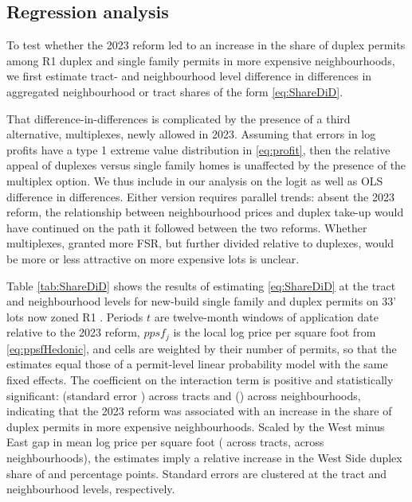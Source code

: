 \documentclass[12pt]{article}
\begin{document}
\subsection{Regression analysis}

To test whether the 2023 reform led to an increase in the share of duplex permits among R1 duplex and single family permits in more expensive neighbourhoods, we first estimate tract- and neighbourhood level difference in differences in aggregated neighbourhood or tract shares of the form \eqref{eq:ShareDiD}.
 
That difference-in-differences is complicated by the presence of a third alternative, multiplexes, newly allowed in 2023. Assuming that errors in log profits have a type 1 extreme value distribution in \eqref{eq:profit}, then the relative appeal of duplexes versus single family homes is unaffected by the presence of the multiplex option. We thus include in our analysis on the logit as well as OLS difference in differences. Either version requires parallel trends: absent the 2023 reform, the relationship between neighbourhood prices and duplex take-up would have continued on the path it followed between the two reforms. Whether multiplexes, granted more FSR, but further divided relative to duplexes, would be more or less attractive on more expensive lots is unclear.


Table \ref{tab:ShareDiD} shows the results of estimating \eqref{eq:ShareDiD} at the tract and neighbourhood levels for new-build single family and duplex permits on 33' lots now zoned R1 \parencite{COVdata,BCAssessment2019}. Periods $t$ are twelve-month windows of application date relative to the 2023 reform, $ppsf_{j}$ is the local log price per square foot from \eqref{eq:ppsfHedonic}, and cells are weighted by their number of permits, so that the estimates equal those of a permit-level linear probability model with the same fixed effects. The coefficient on the interaction term is positive and statistically significant: \sdTractB{} (standard error \sdTractSE) across \sdNTract{} tracts and \sdNbhdB{} (\sdNbhdSE) across \sdNNbhd{} neighbourhoods, indicating that the 2023 reform was associated with an increase in the share of duplex permits in more expensive neighbourhoods. Scaled by the West minus East gap in mean log price per square foot (\sdGapTract{} across tracts, \sdGapNbhd{} across neighbourhoods), the estimates imply a relative increase in the West Side duplex share of \sdEffectGapTract{} and \sdEffectGapNbhd{} percentage points. Standard errors are clustered at the tract and neighbourhood levels, respectively. 
\end{document}
